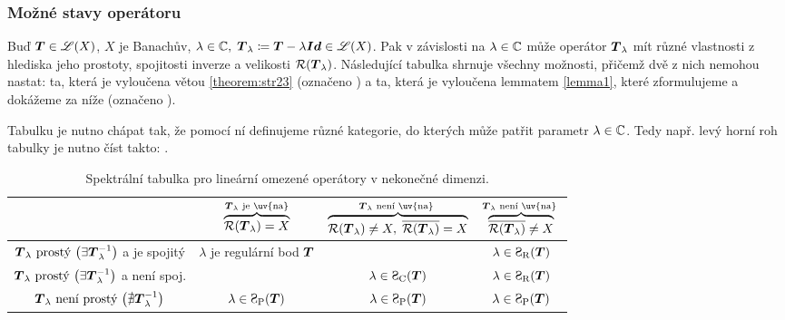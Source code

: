 \subsubsection{Možné stavy operátoru}
Buď $ \boldsymbol{T} \in\mathscr{L}(X)$, $X$ je Banachův, $\lambda\in\mathbb{C},\;  \boldsymbol{T}_\lambda\coloneqq  \boldsymbol{T} -\lambda\boldsymbol{Id} \in\mathscr{L}(X)$. Pak v závislosti na $\lambda\in\mathbb{C}$ může operátor $ \boldsymbol{T}_\lambda$ mít různé vlastnosti z hlediska jeho prostoty, spojitosti inverze a velikosti $\mathcal{R}( \boldsymbol{T}_\lambda)$. Následující tabulka shrnuje všechny možnosti, přičemž dvě z nich nemohou nastat: ta, která je vyloučena větou \ref{theorem:str23} (označeno ) a ta, která je vyloučena lemmatem \ref{lemma1}, které zformulujeme a dokážeme za níže (označeno ).

Tabulku je nutno chápat tak, že pomocí ní definujeme různé kategorie, do kterých může patřit parametr $\lambda\in\mathbb{C}$. Tedy např. levý horní roh tabulky je nutno číst takto: .

\begin{table}[h!]
    \centering
    \begin{tabu}{c||c|c|c}
         &
         $\overbrace{\mathcal{R}( \map T_\lambda)=X}^{ \map T_\lambda \text{ je \uv{na}}}$
         &
         $\overbrace{\mathcal{R}( \map T_\lambda)\neq X,\; \overline{\mathcal{R}( \map T_\lambda)}=X}^{ \map T_\lambda \text{ není \uv{na} }}$
         &
         $\overbrace{\overline{\mathcal{R}( \map T_\lambda)}\neq X}^{ \map T_\lambda \text{ není \uv{na} }}$
         \\
         \hline\hline
         $ \boldsymbol{T}_\lambda \text{ prostý } \big( \exists  \boldsymbol{T}_\lambda^{-1} \big)$ a je spojitý
         & $\lambda$ je regulární bod $ \boldsymbol{T} $
         & 
         & $\lambda\in\SpR( \map T )$
         \\
         \hline
         $ \boldsymbol{T}_\lambda \text{ prostý }\big(\exists  \boldsymbol{T}_\lambda^{-1}\big)$ a není spoj.
         & 
         &  $\lambda\in \SpC( \map T )$
         & $\lambda\in\SpR( \map T )$ 
         \\
         \hline
         $ \boldsymbol{T}_\lambda \text{ není prostý }\big(\nexists  \boldsymbol{T}_\lambda^{-1}\big)$
         & $\lambda\in\SpP( \map T )$
         &  $\lambda\in\SpP( \map T )$
         & $\lambda\in\SpP( \map T )$  \\
    \end{tabu}
    \caption{Spektrální tabulka pro lineární omezené operátory v nekonečné dimenzi.}
    \label{tab:spektra}
\end{table}

